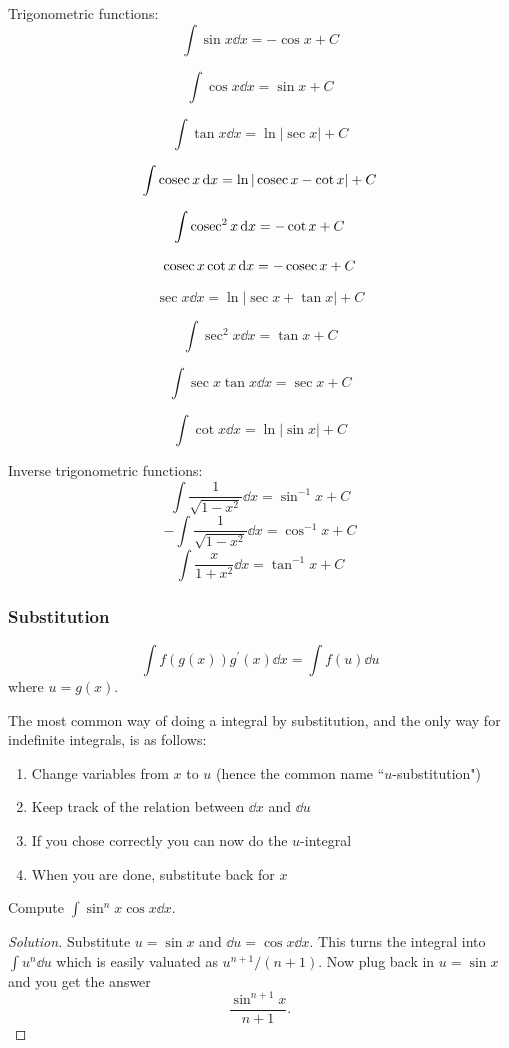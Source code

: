Trigonometric functions:
\[ \int \sin x \dd{x} = -\cos x + C \]

\[ \int \cos x \dd{x} = \sin x + C \]

\[ \int \tan x \dd{x} = \ln|\sec x| + C \]

\[ \int \operatorname{cosec} x \dd{x} = \ln|\operatorname{cosec} x - \cot x| + C \]

\[ \int \operatorname{cosec}^2x \dd{x} = -\cot x + C \]

\[ \operatorname{cosec} x \cot x \dd{x} = -\operatorname{cosec} x + C \]

\[ \sec x \dd{x} = \ln|\sec x + \tan x| + C \]

\[ \int \sec^2 x \dd{x} = \tan x + C \]

\[ \int \sec x \tan x \dd{x} = \sec x + C \]

\[ \int \cot x \dd{x} = \ln|\sin x| + C \]

Inverse trigonometric functions:
\[ \int \frac{1}{\sqrt{1-x^2}} \dd{x} = \sin^{-1}x + C \]
\[ -\int \frac{1}{\sqrt{1-x^2}} \dd{x} = \cos^{-1}x + C \]
\[ \int \frac{x}{1+x^2} \dd{x} = \tan^{-1}x + C \]

\subsubsection{Substitution}
\begin{equation}
\int f(g(x)) g^\prime (x) \dd{x} = \int f(u) \dd{u}
\end{equation}
where $u=g(x)$.

The most common way of doing a integral by substitution, and the only way for indefinite integrals, is as follows:
\begin{enumerate}
\item Change variables from $x$ to $u$ (hence the common name ``$u$-substitution")
\item Keep track of the relation between $\dd{x}$ and $\dd{u}$
\item If you chose correctly you can now do the $u$-integral
\item When you are done, substitute back for $x$
\end{enumerate}

\begin{exmp}{}{}
Compute $\int\sin^nx\cos x\dd{x}$.
\end{exmp}
\begin{proof}[Solution]
Substitute $u = \sin x$ and $\dd{u} = \cos x \dd{x}$. This turns the integral into $\int u^n\dd{u}$ which is easily valuated as $u^{n+1}/(n+1)$. Now plug back in $u = \sin x$ and you get the answer
\[ \frac{\sin^{n+1}x}{n+1}. \]
\end{proof}

